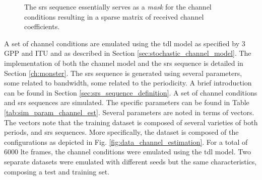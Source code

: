\begin{figure}
    \centering
    \vspace{2em}
    \caption{The \gls{srs} sequence essentially serves as a \emph{mask} for the channel conditions resulting in a sparse matrix of received channel coefficients.}
    \label{fig:srs_sequence_example}
\end{figure}

A set of channel conditions are emulated using the \gls{tdl} model as specified by $3$GPP and ITU \cite{3GPP38901, ITU2412} and as described in Section \ref{sec:stochastic_channel_model}. The implementation of both the channel model and the \gls{srs} sequence is detailed in Section \ref{ch:monster}. The \gls{srs} sequence is generated using several parameters, some related to bandwidth, some related to the periodicity. A brief introduction can be found in Section \ref{sec:srs_sequence_definition}. A set of channel conditions and \gls{srs} sequences are simulated. The specific parameters can be found in Table \ref{tab:sim_param_channel_est}. Several parameters are noted in terms of vectors. The vectors note that the training dataset is composed of several varieties of both periods, and \gls{srs} sequences. More specifically, the dataset is composed of the configurations as depicted in Fig. \ref{fig:data_channel_estimation}. For a total of $6000$ \gls{lte} frames, the channel conditions were emulated using the \gls{tdl} model. Two separate datasets were emulated with different seeds but the same characteristics, composing a test and training set. 


